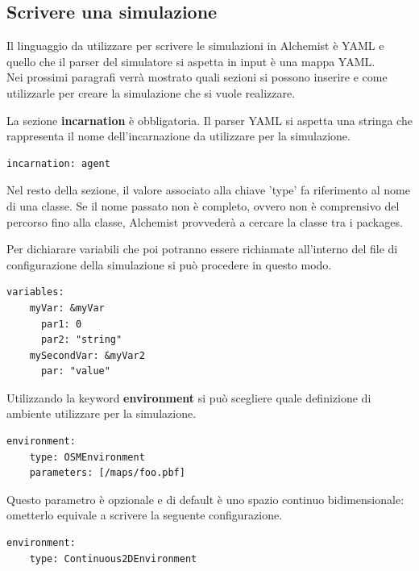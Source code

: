 \documentclass[12pt,a4paper,openright,twoside]{report}
\begin{document}
\subsection{Scrivere una simulazione}
Il linguaggio da utilizzare per scrivere le simulazioni in Alchemist \`e YAML e quello che il parser del simulatore si aspetta in input \`e una mappa YAML.
\\
Nei prossimi paragrafi verr\`a mostrato quali sezioni si possono inserire e come utilizzarle per creare la simulazione che si vuole realizzare.

La sezione \textbf{incarnation} \`e obbligatoria. Il parser YAML si aspetta una stringa che rappresenta il nome dell'incarnazione da utilizzare per la simulazione.
\medskip
\begin{lstlisting}[firstnumber=last,caption={Incarnazione}]
  incarnation: agent
\end{lstlisting}

Nel resto della sezione, il valore associato alla chiave 'type' fa riferimento al nome di una classe. Se il nome passato non \`e completo, ovvero non \`e comprensivo del percorso fino alla classe, Alchemist provveder\`a a cercare la classe tra i packages.

Per dichiarare variabili che poi potranno essere richiamate all'interno del file di configurazione della simulazione si pu\`o procedere in questo modo.
\medskip
\begin{lstlisting}[firstnumber=last,caption={Variabili simulazione}]
  variables:
    myVar: &myVar
      par1: 0
      par2: "string"
    mySecondVar: &myVar2
      par: "value"
\end{lstlisting}

Utilizzando la keyword \textbf{environment} si pu\`o scegliere quale definizione di ambiente utilizzare per la simulazione.
\medskip
\begin{lstlisting}[firstnumber=last,caption={Environment}]
  environment:
    type: OSMEnvironment
    parameters: [/maps/foo.pbf]
\end{lstlisting}
Questo parametro \`e opzionale e di default \`e uno spazio continuo bidimensionale: ometterlo equivale a scrivere la seguente configurazione.
\medskip
\begin{lstlisting}[firstnumber=last,caption={Default environment}]
  environment:
    type: Continuous2DEnvironment
\end{lstlisting}
\end{document}
